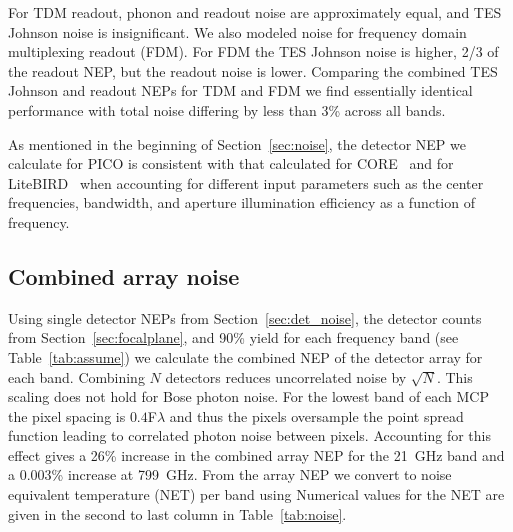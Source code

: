 \documentclass[]{spie}  %
\newcommand{\comr}[1]{\textcolor{red}{#1}}
\newcommand{\como}[1]{\textcolor{orange}{#1}}
\begin{document}
For TDM readout, phonon and readout noise are approximately equal, and TES Johnson noise is insignificant.  We also modeled 
noise for frequency domain multiplexing readout (FDM).  For FDM the TES Johnson noise is higher, 2/3 of the readout NEP, but the readout 
noise is lower.  Comparing the combined TES Johnson and readout NEPs for TDM and FDM we find essentially identical performance 
with total noise differing by less than 3\% across all bands.  


As mentioned in the beginning of Section~\ref{sec:noise}, the detector NEP we calculate for PICO is consistent with 
that calculated for CORE~\cite{core2018_inst} 
and for LiteBIRD~\cite{LB2016_optics,suzuki_private} when accounting for different input parameters such as the center frequencies, bandwidth,  
and aperture illumination efficiency as a function of frequency. 

\subsection{Combined  array noise}

Using single detector NEPs from Section~\ref{sec:det_noise}, the detector counts from Section~\ref{sec:focalplane}, and 90\% yield for 
each frequency band (see Table~\ref{tab:assume}) we 
calculate the combined NEP of the detector array for each band.  Combining $N$ detectors reduces uncorrelated noise by $\sqrt{N}$.  
This scaling does not hold for Bose photon noise. 
For the lowest band of each MCP the pixel spacing is $0.4$F$\lambda$ and thus the pixels oversample the point spread function 
leading to correlated photon noise between pixels.
Accounting for this effect gives a 26\% increase in the combined array NEP for the 21~GHz band 
and a 0.003\% increase at 799~GHz. 
From the array NEP we convert to noise equivalent temperature (NET) per band using
Numerical values for the NET are given in the second to last column in Table~\ref{tab:noise}.
\end{document}
